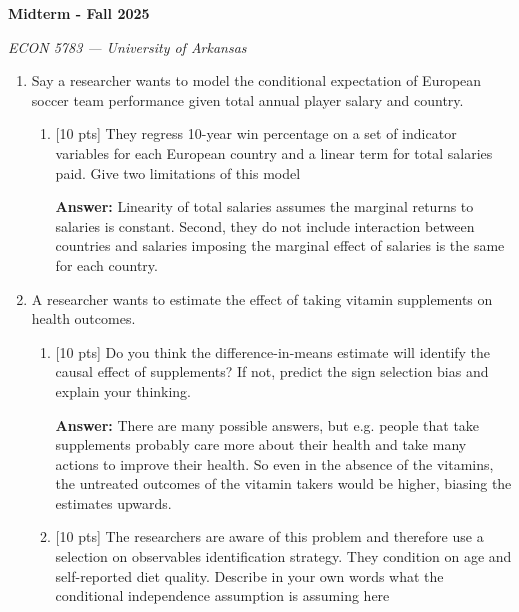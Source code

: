 \documentclass[12pt]{article}
\newcommand{\answer}[1]{{\color{blue_winged_teal}\textbf{Answer:} #1}}
\newcommand{\pts}[1]{{\color{zinc500} [#1 pts]}}
\begin{document}
\begin{center}
  {\Huge\bf Midterm - Fall 2025}

  \smallskip
  {\large\it ECON 5783 — University of Arkansas}
\end{center}

\medskip
\begin{enumerate}
  \item Say a researcher wants to model the conditional expectation
    of European soccer team performance given total annual player
    salary and country.
    \begin{enumerate}[label=(\alph*)]
      \item \pts{10} They regress 10-year win percentage on a set of indicator
        variables for each European country and a linear term for
        total salaries paid.
        Give two limitations of this model 

      \answer{
        Linearity of total salaries assumes the marginal returns to salaries is constant.
        Second, they do not include interaction between countries and salaries imposing the marginal effect of salaries is the same for each country.
      }
    \end{enumerate}

  \bigskip\bigskip
  \item A researcher wants to estimate the effect of taking vitamin
    supplements on health outcomes.

    \begin{enumerate}[label=(\alph*)]
      \item \pts{10} Do you think the difference-in-means estimate will
        identify the causal effect of supplements?
        If not, predict the sign selection bias and explain your thinking.

      \answer{
        There are many possible answers, but e.g. people that take supplements probably care more about their health and take many actions to improve their health. 
        So even in the absence of the vitamins, the untreated outcomes of the vitamin takers would be higher, biasing the estimates upwards. 
      }

      \item \pts{10} The researchers are aware of this problem and therefore
        use a selection on observables identification strategy.
        They condition on age and self-reported diet quality.
        Describe in your own words what the conditional independence
        assumption is assuming here


\end{enumerate}
\end{enumerate}
\end{document}
